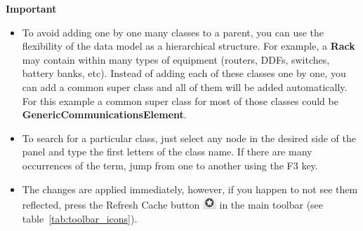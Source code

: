 \documentclass[a4paper]{article}
\begin{document}
	\begin{framed} {\large \textbf{Important}}
		\begin{itemize}
			\item To avoid adding one by one many classes to a parent, you can use the flexibility of the data model as a hierarchical structure. For example, a \textbf{Rack} may contain within many types of equipment (routers, DDFs, switches, battery banks, etc). Instead of adding each of these classes one by one, you can add a common super class and all of them will be added automatically. For this example a common super class for most of those classes could be \textbf{GenericCommunicationsElement}.
			\item To search for a particular class, just select any node in the desired side of the panel and type the first letters of the class name. If there are many occurrences of the term, jump from one to another using the F3 key.
			\item The changes are applied immediately, however, if you happen to not see them reflected, press the Refresh Cache button \includegraphics[width=0.5cm]{img/icon_refresh_cache.png} in the main toolbar (see table~\ref{tab:toolbar_icons}).
		\end{itemize}
	\end{framed}
	

	
	\newpage
\end{document}
